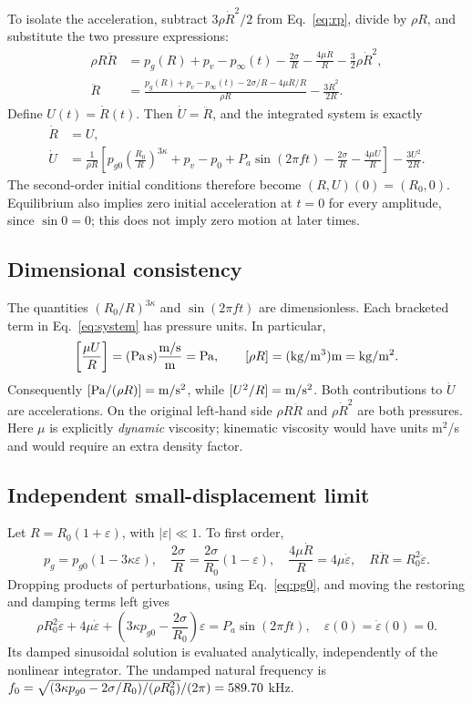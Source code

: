 \documentclass[10pt,a4paper]{article}
\newcommand{\Pa}{P_a}
\begin{document}
To isolate the acceleration, subtract $3\rho\dot R^2/2$ from Eq.~\eqref{eq:rp}, divide by $\rho R$, and substitute the two pressure expressions:
\begin{align}
\rho R\ddot R&=p_g(R)+p_v-p_\infty(t)-\frac{2\sigma}{R}
-\frac{4\mu\dot R}{R}-\frac32\rho\dot R^2,\\
\ddot R&=\frac{p_g(R)+p_v-p_\infty(t)-2\sigma/R-4\mu\dot R/R}{\rho R}
-\frac{3\dot R^2}{2R}.
\end{align}
Define $U(t)=\dot R(t)$. Then $\dot U=\ddot R$, and the integrated system is exactly
\begin{equation}\label{eq:system}
\boxed{\begin{aligned}
\dot R&=U,\\
\dot U&=\frac{1}{\rho R}\left[
p_{g0}\left(\frac{R_0}{R}\right)^{3\kappa}+p_v-p_0+\Pa\sin(2\pi f t)
-\frac{2\sigma}{R}-\frac{4\mu U}{R}\right]-\frac{3U^2}{2R}.
\end{aligned}}
\end{equation}
The second-order initial conditions therefore become $(R,U)(0)=(R_0,0)$. Equilibrium also implies zero initial acceleration at $t=0$ for every amplitude, since $\sin0=0$; this does not imply zero motion at later times.

\subsection{Dimensional consistency}
The quantities $(R_0/R)^{3\kappa}$ and $\sin(2\pi f t)$ are dimensionless. Each bracketed term in Eq.~\eqref{eq:system} has pressure units. In particular,
\[
\left[\frac{\mu U}{R}\right]
=({\rm Pa\,s})\frac{{\rm m/s}}{{\rm m}}={\rm Pa},\qquad
[\rho R]=({\rm kg/m^3}){\rm m}={\rm kg/m^2}.
\]
Consequently $[{\rm Pa}/(\rho R)]={\rm m/s^2}$, while $[U^2/R]={\rm m/s^2}$. Both contributions to $\dot U$ are accelerations. On the original left-hand side $\rho R\ddot R$ and $\rho\dot R^2$ are both pressures. Here $\mu$ is explicitly \emph{dynamic} viscosity; kinematic viscosity would have units m$^2$/s and would require an extra density factor.

\subsection{Independent small-displacement limit}
Let $R=R_0(1+\varepsilon)$, with $|\varepsilon|\ll1$. To first order,
\[
p_g=p_{g0}(1-3\kappa\varepsilon),\quad
\frac{2\sigma}{R}=\frac{2\sigma}{R_0}(1-\varepsilon),\quad
\frac{4\mu\dot R}{R}=4\mu\dot\varepsilon,
\quad R\ddot R=R_0^2\ddot\varepsilon.
\]
Dropping products of perturbations, using Eq.~\eqref{eq:pg0}, and moving the restoring and damping terms left gives
\begin{equation}\label{eq:linear}
\rho R_0^2\ddot\varepsilon+4\mu\dot\varepsilon+
\left(3\kappa p_{g0}-\frac{2\sigma}{R_0}\right)\varepsilon
=\Pa\sin(2\pi f t),\quad \varepsilon(0)=\dot\varepsilon(0)=0.
\end{equation}
Its damped sinusoidal solution is evaluated analytically, independently of the nonlinear integrator. The undamped natural frequency is $f_0=\sqrt{(3\kappa p_{g0}-2\sigma/R_0)/(\rho R_0^2)}/(2\pi)=589.70$ kHz.
\end{document}
